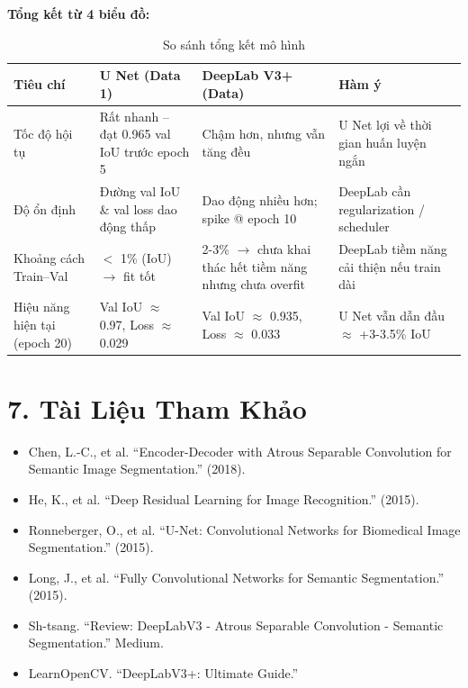 \documentclass[12pt]{report}
\begin{document}
\vspace{1cm}

\textbf{Tổng kết từ 4 biểu đồ:}

\begin{table}[h!]
\centering
\renewcommand{\arraystretch}{1.4}
\small
\begin{tabular}{|L{3.2cm}|C{3cm}|C{3.2cm}|L{4.8cm}|}
\hline
\textbf{Tiêu chí} & \textbf{U Net (Data 1)} & \textbf{DeepLab V3+ (Data)} & \textbf{Hàm ý} \\
\hline
Tốc độ hội tụ & Rất nhanh – đạt 0.965 val IoU trước epoch 5 & Chậm hơn, nhưng vẫn tăng đều & U Net lợi về thời gian huấn luyện ngắn \\
\hline
Độ ổn định & Đường val IoU \& val loss dao động thấp & Dao động nhiều hơn; spike @ epoch 10 & DeepLab cần regularization / scheduler \\
\hline
Khoảng cách Train–Val & $<$ 1\% (IoU) $\rightarrow$ fit tốt & 2-3\% $\rightarrow$ chưa khai thác hết tiềm năng nhưng chưa overfit & DeepLab tiềm năng cải thiện nếu train dài \\
\hline
Hiệu năng hiện tại (epoch 20) & Val IoU $\approx$ 0.97, Loss $\approx$ 0.029 & Val IoU $\approx$ 0.935, Loss $\approx$ 0.033 & U Net vẫn dẫn đầu $\approx$ +3-3.5\% IoU \\
\hline
\end{tabular}
\caption{So sánh tổng kết mô hình}
\end{table}

\chapter*{7. Tài Liệu Tham Khảo}
\begin{itemize}
    \item \parbox[t]{0.9\textwidth}{Chen, L.-C., et al. ``Encoder-Decoder with Atrous Separable Convolution for Semantic Image Segmentation.'' (2018).}
    \item \parbox[t]{0.9\textwidth}{He, K., et al. ``Deep Residual Learning for Image Recognition.'' (2015).}
    \item \parbox[t]{0.9\textwidth}{Ronneberger, O., et al. ``U-Net: Convolutional Networks for Biomedical Image Segmentation.'' (2015).}
    \item \parbox[t]{0.9\textwidth}{Long, J., et al. ``Fully Convolutional Networks for Semantic Segmentation.'' (2015).}
    \item \parbox[t]{0.9\textwidth}{Sh-tsang. ``Review: DeepLabV3 - Atrous Separable Convolution - Semantic Segmentation.'' Medium.}
    \item \parbox[t]{0.9\textwidth}{LearnOpenCV. ``DeepLabV3+: Ultimate Guide.''}
\end{itemize}
\end{document}

